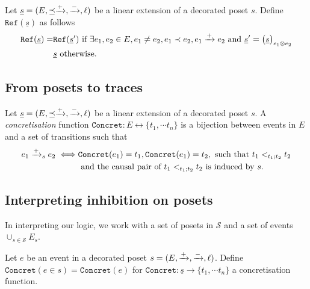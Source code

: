 \begin{definition}
  \label{def:ref_poset}
  Let $\underline s=(E,\preceq\mathrel{\xrightarrow{+}},\mathrel{\xrightarrow{-}},\ell)$ be a linear extension of a decorated poset $s$.
  Define $\mathtt{Ref}(\underline s)$ as follows
  \begin{align*}
    \mathtt{Ref}(\underline s) =&
    \mathtt{Ref}(\underline s')\text{ if }\exists e_1,e_2\in E, e_1\neq e_2, e_1\prec e_2, e_1\mathrel{\xrightarrow{+}}e_2
    \text{ and }\underline s'=\big(\underline s\big)_{e_1\otimes e_2}
    \\
    &\underline s\text{ otherwise.}\\
  \end{align*}
\end{definition}


\subsection{From posets to traces}
%

\begin{definition}
  Let $\underline s=(E,\preceq\mathrel{\xrightarrow{+}},\mathrel{\xrightarrow{-}},\ell)$ be a linear extension of a decorated poset $s$. A \emph{concretisation} function  $\mathtt{Concret}:E\leftrightarrow \{t_1,\cdots t_n\}$ is a bijection between events in $E$ and a set of transitions such that
  \begin{align*}
    e_1\mathrel{\xrightarrow{+}}_s e_2 \iff& \mathtt{Concret}(e_1) = t_1, \mathtt{Concret}(e_1) = t_2, \text{ such that }t_1<_{t_1;t_2}t_2\\
    &\text{ and the causal pair of }t_1<_{t_1;t_2}t_2\text{ is induced by }s.
  \end{align*}
\end{definition}
%

\subsection{Interpreting inhibition on posets}

In interpreting our logic, we work with a set of posets in $\mathcal{S}$ and a set of events $\cup_{s\in\mathcal{S}} E_s$.

\begin{definition}
  Let $e$ be an event in a decorated poset $s=(E,\mathrel{\xrightarrow{+}},\mathrel{\xrightarrow{-}},\ell)$.
  Define $\mathtt{Concret}(e\in s) = \mathtt{Concret}(e)$ for $\mathtt{Concret}:\underline{s}\to\{t_1,\cdots t_n\}$ a concretisation function.
\end{definition}

